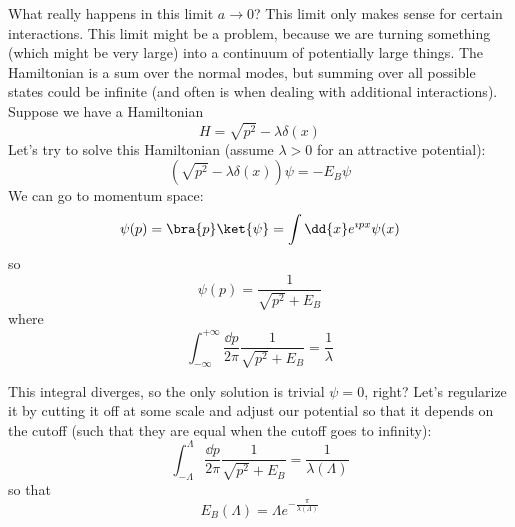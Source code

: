 \documentclass[a4paper,twoside,master.tex]{subfiles}
\begin{document}
What really happens in this limit $ a \to 0 $? This limit only makes sense for certain interactions. This limit might be a problem, because we are turning something (which might be very large) into a continuum of potentially large things. The Hamiltonian is a sum over the normal modes, but summing over all possible states could be infinite (and often is when dealing with additional interactions). Suppose we have a Hamiltonian
\begin{equation}
    H = \sqrt{p^2} - \lambda \delta(x)
\end{equation}
Let's try to solve this Hamiltonian (assume $ \lambda > 0 $ for an attractive potential):
\begin{equation}
    (\sqrt{p^2} - \lambda \delta(x)) \psi = - E_B \psi
\end{equation}
We can go to momentum space:
\begin{equation}
    \psi(p) =\bra{p}\ket{\psi} = \int \dd{x} e^{\imath p x} \psi(x)
\end{equation}
so
\begin{equation}
    \psi(p) = \frac{1}{\sqrt{p^2} + E_B}
\end{equation}
where
\begin{equation}
    \int_{- \infty}^{+ \infty} \frac{\dd{p}}{2 \pi} \frac{1}{\sqrt{p^2} + E_B} = \frac{1}{\lambda}
\end{equation}

This integral diverges, so the only solution is trivial $ \psi = 0 $, right? Let's regularize it by cutting it off at some scale and adjust our potential so that it depends on the cutoff (such that they are equal when the cutoff goes to infinity):
\begin{equation}
    \int^{\Lambda}_{- \Lambda} \frac{\dd{p}}{2 \pi} \frac{1}{\sqrt{p^2} + E_B} = \frac{1}{\lambda(\Lambda)}
\end{equation}
so that
\begin{equation}
    E_B(\Lambda) = \Lambda e^{- \frac{\pi}{\lambda(\Lambda)}}
\end{equation}
\end{document}
